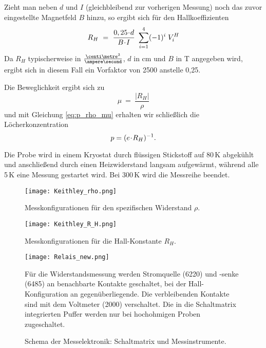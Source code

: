 Zieht man neben $d$ und $I$ (gleichbleibend zur vorherigen Messung) noch das zuvor eingestellte Magnetfeld $B$ hinzu, so ergibt sich für den Hallkoeffizienten 
\begin{equation}
R_H ~=~ \frac{0,25 \!\cdot\! d}{B \!\cdot\! I} ~ \sum\limits_{i=1}^4 (-1)^i \; V^H_i
\end{equation}
Da $R_H$ typischerweise in $\tfrac{\centi\metre^3}{\ampere\second}$, $d$ in cm und $B$ in T angegeben wird, ergibt sich in diesem Fall ein Vorfaktor von 2500 anstelle 0,25.

Die Beweglichkeit ergibt sich zu
\begin{equation}
\mu ~=~ \frac{|R_H|}{\rho}
\end{equation}
und mit Gleichung \eqref{eq:p_rho_mu} erhalten wir schließlich die Löcherkonzentration
\begin{equation}
p = (e \!\cdot\! R_H)^{-1}.
\end{equation}

Die Probe wird in einem Kryostat durch flüssigen Stickstoff auf 80\,K abgekühlt und anschließend durch einen Heizwiderstand langsam aufgewärmt, während alle 5\,K eine Messung gestartet wird. Bei 300\,K wird die Messreihe beendet.

\begin{figure}[p]
\centering
\texttt{[image: Keithley\_rho.png]}
\caption{Messkonfigurationen für den spezifischen Widerstand $\rho$. \cite[Fig. 3-3]{lit:manual}}
\label{fig:keithley1}
\end{figure}

\begin{figure}[p]
\centering
\texttt{[image: Keithley\_R\_H.png]}
\caption{Messkonfigurationen für die Hall-Konstante $R_H$. \cite[Fig. 3-4]{lit:manual}}
\label{fig:keithley2}
\end{figure}

\begin{figure}[p]
\centering
\texttt{[image: Relais\_new.png]}
\caption{Schema der Messelektronik: Schaltmatrix und Messinstrumente. \cite{lit:keithley}}
\vspace{1ex}
Für die Widerstandsmessung werden Stromquelle (6220) und -senke (6485) an benachbarte Kontakte geschaltet, bei der Hall-Konfiguration an gegenüberliegende. Die verbleibenden Kontakte sind mit dem Voltmeter (2000) verschaltet. Die in die Schaltmatrix integrierten Puffer werden nur bei hochohmigen Proben zugeschaltet.
\label{fig:keithley3}
\end{figure}

